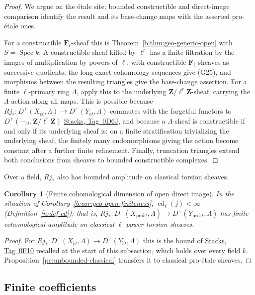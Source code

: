 \documentclass[11pt,a4paper]{article}
\numberwithin{equation}{section}
\newtheorem{corollary}[theorem]{Corollary}
\theoremstyle{definition}
\theoremstyle{remark}
\newcommand{\Fell}{\mathbf F_\ell}
\newcommand{\et}{\acute{e}t}
\newcommand{\proet}{\mathrm{pro}\acute{e}t}
\newcommand{\stacks}[1]{\href{https://stacks.math.columbia.edu/tag/#1}{\textnormal{Stacks, Tag~#1}}}
\begin{document}
\begin{proof}
We argue on the \'etale site; bounded constructible and direct-image
comparison identify the result and its base-change maps with the
asserted pro-\'etale ones.

For a constructible \(\Fell\)-sheaf this is
Theorem~\ref{b:thm:geo-generic-open} with \(S=\operatorname{Spec}k\). A
constructible sheaf killed by \(\ell^r\) has a finite filtration by the
images of multiplication by powers of \(\ell\), with constructible
\(\Fell\)-sheaves as successive quotients; the long exact cohomology
sequences give (G25), and morphisms between the resulting triangles give
the base-change assertion. For a finite \(\ell\)-primary ring
\(\Lambda\), apply this to the underlying
\(\mathbf Z/\ell^r\mathbf Z\)-sheaf, carrying the \(\Lambda\)-action
along all maps. This is possible because \(Rj_*\colon D^+(X_{\et},\Lambda)\to
D^+(Y_{\et},\Lambda)\) commutes with the forgetful functors to
\(D^+(-_{\et},\mathbf Z/\ell^r\mathbf Z)\) \stacks{0D6J}, and because a \(\Lambda\)-sheaf
is constructible if and only if its underlying sheaf is: on a finite
stratification trivializing the underlying sheaf, the finitely many
endomorphisms giving the action become constant after a further finite
refinement. Finally, truncation triangles extend both conclusions from
sheaves to bounded constructible complexes.
\end{proof}

Over a field, $Rj_*$ also has bounded amplitude on classical torsion sheaves.

\begin{corollary}[Finite cohomological dimension of open direct image]
\label{b:cor:geo-open-finiteness-b}
In the situation of Corollary~\ref{b:cor:geo-open-finiteness},
$\operatorname{cd}_\ell(j)<\infty$ (Definition~\ref{n:def-cd}); that is,
$Rj_*\colon D^+(X_{\proet},\Lambda)\to D^+(Y_{\proet},\Lambda)$ has
finite cohomological amplitude on classical $\ell$-power torsion
sheaves.
\end{corollary}

\begin{proof}
For \(Rj_*\colon D^+(X_{\et},\Lambda)\to D^+(Y_{\et},\Lambda)\) this
is the bound of \stacks{0F10} recalled at the start of this subsection,
which holds over every field \(k\).
Proposition~\ref{pe:unbounded-classical} transfers it to classical
pro-\'etale sheaves.
\end{proof}


\subsection{Finite coefficients}
\label{ctf:finite-geometric-restriction}
\end{document}
